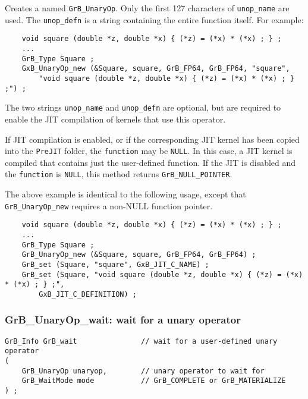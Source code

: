 \documentclass[12pt]{article}
\begin{document}
Creates a named \verb'GrB_UnaryOp'.  Only the first 127 characters of
\verb'unop_name' are used.  The \verb'unop_defn' is a string containing the
entire function itself.  For example:

    {\footnotesize
    \begin{verbatim}
    void square (double *z, double *x) { (*z) = (*x) * (*x) ; } ;
    ...
    GrB_Type Square ;
    GxB_UnaryOp_new (&Square, square, GrB_FP64, GrB_FP64, "square",
        "void square (double *z, double *x) { (*z) = (*x) * (*x) ; } ;") ;
    \end{verbatim}}

The two strings \verb'unop_name' and \verb'unop_defn' are optional, but are
required to enable the JIT compilation of kernels that use this operator.

If JIT compilation is enabled, or if the corresponding JIT kernel has been
copied into the \verb'PreJIT' folder, the \verb'function' may be \verb'NULL'.
In this case, a JIT kernel is compiled that contains just the user-defined
function.  If the JIT is disabled and the \verb'function' is \verb'NULL', this
method returns \verb'GrB_NULL_POINTER'.

The above example is identical to the following usage, except that
\verb'GrB_UnaryOp_new' requires a non-NULL function pointer.

    {\footnotesize
    \begin{verbatim}
    void square (double *z, double *x) { (*z) = (*x) * (*x) ; } ;
    ...
    GrB_Type Square ;
    GrB_UnaryOp_new (&Square, square, GrB_FP64, GrB_FP64) ;
    GrB_set (Square, "square", GxB_JIT_C_NAME) ;
    GrB_set (Square, "void square (double *z, double *x) { (*z) = (*x) * (*x) ; } ;",
        GxB_JIT_C_DEFINITION) ; \end{verbatim}}

\subsubsection{{\sf GrB\_UnaryOp\_wait:} wait for a unary operator}
\label{unaryop_wait}

\begin{mdframed}[userdefinedwidth=6in]
{\footnotesize
\begin{verbatim}
GrB_Info GrB_wait               // wait for a user-defined unary operator
(
    GrB_UnaryOp unaryop,        // unary operator to wait for
    GrB_WaitMode mode           // GrB_COMPLETE or GrB_MATERIALIZE
) ;
\end{verbatim}
}\end{mdframed}
\end{document}
